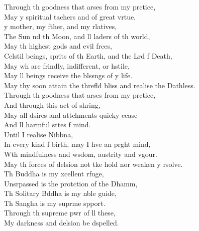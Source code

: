 Through th goodness that arses from my prctice,\\
May y spiritual tachers and  of great vrtue,\\
y mother, my fther, and my rlatives,\\
The Sun nd th Moon, and ll  laders of th world,\\
May th highest gods and evil frces,\\
Celstil beings,  sprits of th Earth, and the Lrd f Death,\\
May  wh are frindly, indifferent, or hstile,\\
May ll beings receive the blssngs of y life.\\
May thy soon attain the threfld bliss and realise the Dathless.\\
Through th goodness that arses from my prctice,\\
And through this act of shring,\\
May all dsires and attchments quicky cease\\
And ll harmful sttes f mind.\\
Until I realise Nibbna,\\
In every kind f birth, may I hve an prght mind,\\
Wth mindfulness and wsdom, austrity and vgour.\\
May th forces of delsion not tke hold nor weaken y rsolve.\\
Th Buddha is my xcellent rfuge,\\
Unsrpassed is the protction of the Dhamm,\\
Th Solitary Bddha is my nble guide,\\
Th Sangha is my suprme spport.\\
Through th supreme pwr of ll these,\\
My darkness and delsion be dspelled.

